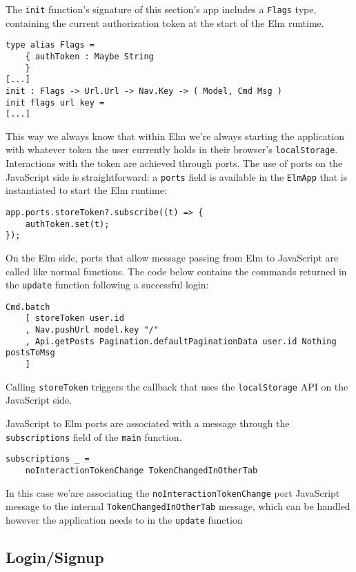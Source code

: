 The \texttt{init} function's signature of this section's app includes a \texttt{Flags} type, containing the current authorization token at the start of the Elm runtime. 
\begin{verbatim}
type alias Flags =
    { authToken : Maybe String
    }
[...]
init : Flags -> Url.Url -> Nav.Key -> ( Model, Cmd Msg )
init flags url key =
[...]
\end{verbatim}

This way we always know that within Elm we're always starting the application with whatever token the user currently holds in their browser's \texttt{localStorage}.\\

Interactions with the token are achieved through ports. The use of ports on the JavaScript side is straightforward: a \texttt{ports} field is available in the \texttt{ElmApp} that is instantiated to start the Elm runtime:
\begin{verbatim}
app.ports.storeToken?.subscribe((t) => {
    authToken.set(t);
});
\end{verbatim}
On the Elm side, ports that allow message passing from Elm to JavaScript are called like normal functions. The code below contains the commands returned in the \texttt{update} function following a successful login:
\begin{verbatim}
Cmd.batch
    [ storeToken user.id
    , Nav.pushUrl model.key "/"
    , Api.getPosts Pagination.defaultPaginationData user.id Nothing postsToMsg
    ]
\end{verbatim}
Calling \texttt{storeToken} triggers the callback that uses the \texttt{localStorage} API on the JavaScript side.

JavaScript to Elm ports are associated with a message through the \texttt{subscriptions} field of the \texttt{main} function.
\begin{verbatim}
subscriptions _ =
    noInteractionTokenChange TokenChangedInOtherTab
\end{verbatim}
In this case we'are associating the \texttt{noInteractionTokenChange} port JavaScript message to the internal \texttt{TokenChangedInOtherTab} message, which can be handled however the application needs to in the \texttt{update} function


\subsection{Login/Signup}

